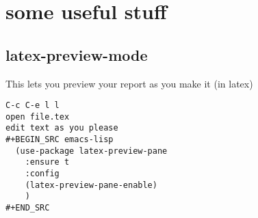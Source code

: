 \documentclass[11pt]{article}
\begin{document}
\section{some useful stuff}
\label{sec:org8a38a6e}

\subsection{latex-preview-mode}
\label{sec:orgd00ac7e}
This lets you preview your report as you make it (in latex)

\begin{verbatim}
C-c C-e l l
open file.tex
edit text as you please
#+BEGIN_SRC emacs-lisp
  (use-package latex-preview-pane
    :ensure t
    :config
    (latex-preview-pane-enable)
    )
#+END_SRC

\end{verbatim}
\end{document}
